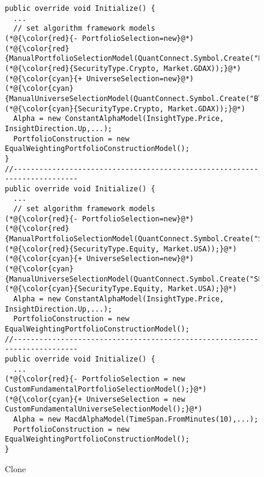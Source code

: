 \begin{figure}[t]
	\centering
	\begin{lstlisting}[]
public override void Initialize() {
  ...
  // set algorithm framework models
(*@{\color{red}{- PortfolioSelection=new}@*) (*@{\color{red}{ManualPortfolioSelectionModel(QuantConnect.Symbol.Create("BTCUSD",}@*) (*@{\color{red}{SecurityType.Crypto, Market.GDAX));}@*)   
(*@{\color{cyan}{+ UniverseSelection=new}@*) (*@{\color{cyan}{ManualUniverseSelectionModel(QuantConnect.Symbol.Create("BTCUSD",}@*) (*@{\color{cyan}{SecurityType.Crypto, Market.GDAX));}@*)
  Alpha = new ConstantAlphaModel(InsightType.Price, InsightDirection.Up,...);
  PortfolioConstruction = new EqualWeightingPortfolioConstructionModel();
}
//--------------------------------------------------------------------------
public override void Initialize() {
  ...
  // set algorithm framework models
(*@{\color{red}{- PortfolioSelection=new}@*) (*@{\color{red}{ManualPortfolioSelectionModel(QuantConnect.Symbol.Create("SPY",}@*) (*@{\color{red}{SecurityType.Equity, Market.USA));}@*)   
(*@{\color{cyan}{+ UniverseSelection=new}@*) (*@{\color{cyan}{ManualUniverseSelectionModel(QuantConnect.Symbol.Create("SPY",}@*) (*@{\color{cyan}{SecurityType.Equity, Market.USA);}@*)
  Alpha = new ConstantAlphaModel(InsightType.Price, InsightDirection.Up,...);
  PortfolioConstruction = new EqualWeightingPortfolioConstructionModel();
//--------------------------------------------------------------------------
public override void Initialize() {
  ...
(*@{\color{red}{- PortfolioSelection = new CustomFundamentalPortfolioSelectionModel();}@*)
(*@{\color{cyan}{+ UniverseSelection = new CustomFundamentalUniverseSelectionModel();}@*)
  Alpha = new MacdAlphaModel(TimeSpan.FromMinutes(10),...);
  PortfolioConstruction = new EqualWeightingPortfolioConstructionModel();
}
	\end{lstlisting}
        \vspace{-15pt}
        \caption{Clone}
        \vspace{-6pt}
        \label{fig:motiv-clone}
\end{figure}

